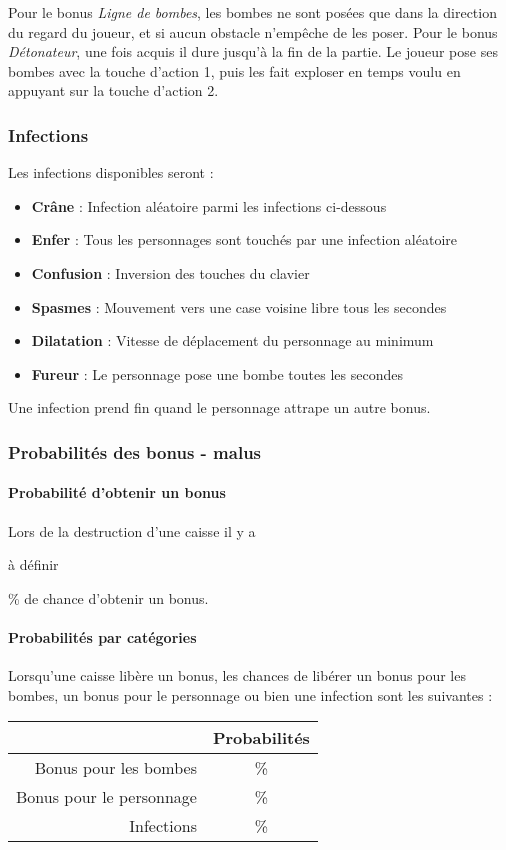 Pour le bonus \emph{Ligne de bombes}, les bombes ne sont posées que dans la direction du regard du joueur, et si aucun obstacle n'empêche de les poser. Pour le bonus \emph{Détonateur}, une fois acquis il dure jusqu'à la fin de la partie. Le joueur pose ses bombes avec la touche d'action 1, puis les fait exploser en temps voulu en appuyant sur la touche d'action 2.

\subsubsection{Infections}

Les infections disponibles seront :
\begin{itemize}
\item \textbf{Crâne} : Infection aléatoire parmi les infections ci-dessous
\item \textbf{Enfer} : Tous les personnages sont touchés par une infection aléatoire
\item \textbf{Confusion} : Inversion des touches du clavier
\item \textbf{Spasmes} : Mouvement vers une case voisine libre tous les \nbSecondes secondes
\item \textbf{Dilatation} : Vitesse de déplacement du personnage au minimum
\item \textbf{Fureur} : Le personnage pose une bombe toutes les \nbSecondes secondes
\end{itemize}

Une infection prend fin quand le personnage attrape un autre bonus.

\subsubsection{Probabilités des bonus - malus}

\paragraph{Probabilité d'obtenir un bonus}
Lors de la destruction d'une caisse il y a \begin{huge}à définir\end{huge} \% de chance d'obtenir un bonus.

\paragraph{Probabilités par catégories}
Lorsqu'une caisse libère un bonus, les chances de libérer un bonus pour les bombes, un bonus pour le personnage ou bien une infection sont les suivantes :
\begin{center}
\begin{tabular}{|r|c|}
\hline 
& Probabilités \\ 
\hline 
Bonus pour les bombes & \% \\ 
\hline 
Bonus pour le personnage & \% \\ 
\hline 
Infections & \% \\ 
\hline 
\end{tabular} 
\end{center}

